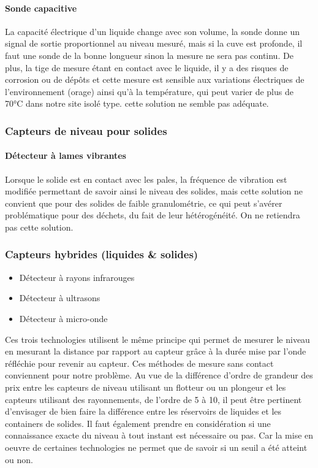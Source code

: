 \paragraph{Sonde capacitive}
La capacité électrique d'un liquide change avec son volume, la sonde donne un signal de sortie proportionnel au niveau mesuré, mais si la cuve est profonde, il faut une sonde de la bonne longueur sinon la mesure ne sera pas continu. De plus, la tige de mesure étant en contact avec le liquide, il y a des risques de corrosion ou de dépôts et cette mesure est sensible aux variations électriques de l'environnement (orage) ainsi qu'à la température, qui peut varier de plus de 70°C dans notre site isolé type. cette solution ne semble pas adéquate.

\subsubsection{Capteurs de niveau pour solides} 

\paragraph{Détecteur à lames vibrantes}

Lorsque le solide est en contact avec les pales, la fréquence de vibration est modifiée permettant de savoir ainsi le niveau des solides, mais cette solution ne convient que pour des solides de faible granulométrie, ce qui peut s’avérer problématique pour des déchets, du fait de leur hétérogénéité. On ne retiendra pas cette solution.

\subsubsection{Capteurs hybrides (liquides \&  solides)}

\begin{itemize}
\item Détecteur à rayons infrarouges
\item Détecteur à ultrasons
\item Détecteur à micro-onde
\end{itemize}

Ces trois technologies utilisent le même principe qui permet de mesurer le niveau en mesurant la distance par rapport au capteur grâce à la durée mise par l’onde réfléchie pour revenir au capteur. Ces méthodes de mesure sans contact conviennent pour notre problème.
Au vue de la différence d'ordre de grandeur des prix entre les capteurs de niveau utilisant un flotteur ou un plongeur et les capteurs utilisant des rayonnements, de l'ordre de 5 à 10\footnotemark, il peut être pertinent d'envisager de bien faire la différence entre les réservoirs de liquides et les containers de solides. Il faut également prendre en considération si une connaissance exacte du niveau à tout instant est nécessaire ou pas. Car la mise en oeuvre de certaines technologies ne permet que de savoir si un seuil a été atteint ou non.

